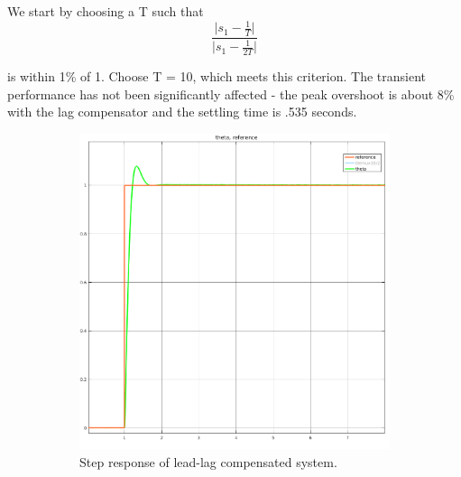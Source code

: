 \documentclass[11pt,a4paper]{article}
\begin{document}
We start by choosing a T such that 
\begin{equation}
\frac{\lvert s_{1} - \frac{1}{T} \rvert}{\lvert s_{1} - \frac{1}{2T} \rvert}
\end{equation}

is within 1\% of 1. Choose T = 10, which meets this criterion. The transient performance has not been significantly affected - the peak overshoot is about 8\% with the lag compensator and the settling time is .535 seconds.


\begin{figure}[!htbp]
	\centering
	\begin{subfigure}{.5\textwidth}
		\centering
		\includegraphics[width = \textwidth]{imglab/lab4sol_trajleadlagstep.png}
		\caption{Step response of lead-lag compensated system.}
	\end{subfigure}%
	\begin{subfigure}{.5\textwidth}
		\centering

\end{subfigure}
\end{figure}
\end{document}
